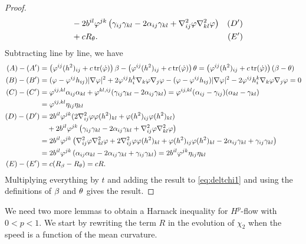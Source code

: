 \documentclass{amsart}
\begin{document}
\begin{proof}
\begin{align*}
&\quad - 2b^{il} \varphi^{jk} \left(\gamma_{ij} \gamma_{kl} - 2\alpha_{ij} \gamma_{kl} + \nabla^2_{ij}\varphi\nabla^2_{kl}\varphi\right) & (D') \\
&\quad + cR_{\theta}. & (E')
\end{align*}
Subtracting line by line, we have
\begin{align*}
(A) - (A') &= \left(\varphi^{ij}(h^2)_{ij} + c\operatorname{tr}(\dot{\varphi}) \right)\beta - \left(\varphi^{ij}(h^2)_{ij} + c\operatorname{tr}(\dot{\varphi}) \right)\theta = \left(\varphi^{ij}(h^2)_{ij} + c\operatorname{tr}(\dot{\varphi}) \right)(\beta - \theta) \\
(B) - (B') &= (\varphi - \varphi^{ij}h_{ij}) |\nabla\varphi|^{2} + 2\varphi^{ij}h^{k}_{i}\nabla_k \varphi \nabla_j \varphi - (\varphi - \varphi^{ij}h_{ij})|\nabla\varphi|^{2} - 2\varphi^{ij}h^{k}_{i}\nabla_k\varphi\nabla_j\varphi = 0 \\
(C) - (C') &= \varphi^{ij,kl} \alpha_{ij} \alpha_{kl} + \varphi^{kl,ij} (\gamma_{ij}\gamma_{kl}  - 2\alpha_{ij} \gamma_{kl}) = \varphi^{ij,kl} (\alpha_{ij} - \gamma_{ij}) (\alpha_{kl} - \gamma_{kl}) \\
&= \varphi^{ij,kl} \eta_{ij} \eta_{kl} \\
(D) - (D') &= 2b^{il}\varphi^{jk} (2\nabla^2_{ij}\varphi\varphi(h^2)_{kl} + \varphi(h^2)_{ij}\varphi(h^2)_{kl}) \\
&\quad + 2b^{il} \varphi^{jk} \left(\gamma_{ij} \gamma_{kl} - 2\alpha_{ij} \gamma_{kl} + \nabla^2_{ij}\varphi\nabla^2_{kl}\varphi\right) \\
&= 2b^{il}\varphi^{jk} \left(\nabla^2_{ij}\varphi\nabla^2_{kl}\varphi +2\nabla^2_{ij}\varphi\varphi(h^2)_{kl} + \varphi(h^2)_{ij}\varphi(h^2)_{kl} - 2 \alpha_{ij} \gamma_{kl} + \gamma_{ij} \gamma_{kl} \right) \\
&= 2b^{il}\varphi^{jk} \left(\alpha_{ij}\alpha_{kl} - 2 \alpha_{ij} \gamma_{kl} + \gamma_{ij} \gamma_{kl} \right) = 2b^{il}\varphi^{jk} \eta_{ij} \eta_{kl} \\
(E) - (E') &= c(R_{\beta} - R_{\theta}) = cR.\\
\end{align*}
Multiplying everything by \(t\) and adding the result to \cref{eq:deltchi1} and using the definitions of $\beta$ and $\theta$ gives the result.
\end{proof}
We need two more lemmas to obtain a Harnack inequality for $H^{p}$-flow with $0<p<1.$  We start by rewriting the term $R$ in the evolution of \(\chi_2\) when the speed is a function of the mean curvature.
\end{document}
